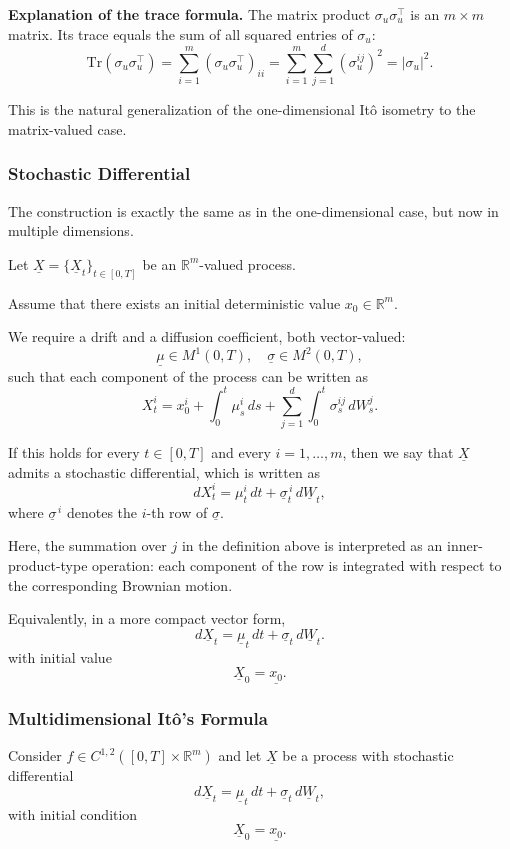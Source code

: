 \documentclass[12pt,a4paper]{article}
\theoremstyle{definition}
\newcommand{\R}{\mathbb{R}}
\begin{document}
\textbf{Explanation of the trace formula.} The matrix product $\sigma_u \sigma_u^\top$ is an $m \times m$ matrix. Its trace equals the sum of all squared entries of $\sigma_u$:
\[
\text{Tr}(\sigma_u \sigma_u^\top) = \sum_{i=1}^m (\sigma_u \sigma_u^\top)_{ii} = \sum_{i=1}^m \sum_{j=1}^d (\sigma_u^{ij})^2 = |\sigma_u|^2.
\]

This is the natural generalization of the one-dimensional Itô isometry to the matrix-valued case.

\subsubsection{Stochastic Differential}

The construction is exactly the same as in the one-dimensional case, but now in multiple dimensions.

Let $\underline{X} = \{\underline{X}_t\}_{t \in [0,T]}$ be an $\R^m$-valued process.

Assume that there exists an initial deterministic value $x_0 \in \R^m$.

We require a drift and a diffusion coefficient, both vector-valued:
\[
\underline{\mu} \in M^1(0,T), \quad \underline{\sigma} \in M^2(0,T),
\]
such that each component of the process can be written as
\[
X_t^i = x_0^i + \int_0^t \mu_s^i \, ds + \sum_{j=1}^d \int_0^t \sigma_s^{ij} \, dW_s^j.
\]

If this holds for every $t \in [0,T]$ and every $i = 1, \ldots, m$, then we say that $\underline{X}$ admits a stochastic differential, which is written as
\[
dX_t^i = \mu_t^i \, dt + \underline{\sigma}_t^{\,i} \, d\underline{W}_t,
\]
where $\underline{\sigma}^{\,i}$ denotes the $i$-th row of $\underline{\sigma}$.

Here, the summation over $j$ in the definition above is interpreted as an inner-product-type operation: each component of the row is integrated with respect to the corresponding Brownian motion.

Equivalently, in a more compact vector form,
\[
d\underline{X}_t = \underline{\mu}_t \, dt + \underline{\sigma}_t \, d\underline{W}_t.
\]
with initial value
\[
\underline{X}_0 = \underline{x_0}.
\]

\subsubsection{Multidimensional Itô's Formula}

Consider $f \in C^{1,2}([0,T] \times \R^m)$ and let $\underline{X}$ be a process with stochastic differential
\[
d\underline{X}_t = \underline{\mu}_t \, dt + \underline{\sigma}_t \, d\underline{W}_t,
\]
with initial condition
\[
\underline{X}_0 = \underline{x_0}.
\]
\end{document}
